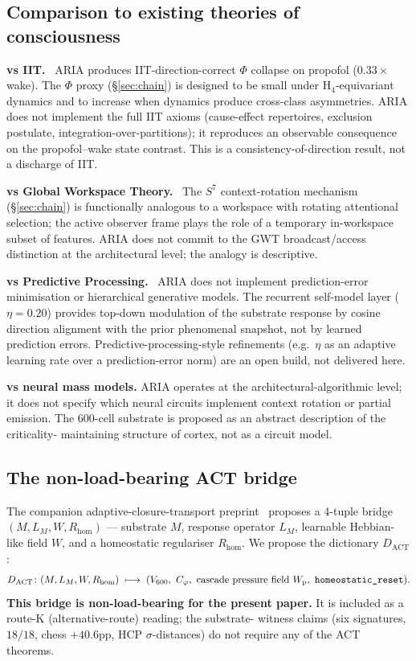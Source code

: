 \subsection{Comparison to existing theories of consciousness}

\textbf{vs IIT.}~\citep{Tononi2008,BalduzziTononi2008} ARIA produces
IIT-direction-correct $\Phi$ collapse on propofol ($0.33\!\times$
wake). The $\Phi$ proxy (\S\ref{sec:chain}) is designed to be small
under H$_4$-equivariant dynamics and to increase when dynamics
produce cross-class asymmetries. ARIA does not implement the full
IIT axioms (cause-effect repertoires, exclusion postulate,
integration-over-partitions); it reproduces an observable consequence
on the propofol--wake state contrast. This is a consistency-of-direction
result, not a discharge of IIT.

\textbf{vs Global Workspace Theory.}~\citep{Baars1988GWT,Dehaene2014ConsciousAndBrain}
The $S^{7}$ context-rotation mechanism (\S\ref{sec:chain}) is
functionally analogous to a workspace with rotating attentional
selection; the active observer frame plays the role of a temporary
in-workspace subset of features. ARIA does not commit to the GWT
broadcast/access distinction at the architectural level; the
analogy is descriptive.

\textbf{vs Predictive Processing.}~\citep{FristonFreeEnergy2010,ClarkPP2013}
ARIA does not implement prediction-error minimisation or hierarchical
generative models.
The recurrent self-model layer ($\eta\!=\!0.20$) provides top-down
modulation of the substrate response by cosine direction alignment
with the prior phenomenal snapshot, not by learned prediction errors.
Predictive-processing-style refinements (e.g.\ $\eta$ as an adaptive
learning rate over a prediction-error norm) are an open build, not
delivered here.

\textbf{vs neural mass models.} ARIA operates at the
architectural-algorithmic level; it does not specify which neural
circuits implement context rotation or partial emission. The 600-cell
substrate is proposed as an abstract description of the criticality-
maintaining structure of cortex, not as a circuit model.

\subsection{The non-load-bearing ACT bridge}\label{ssec:act_bridge}

The companion adaptive-closure-transport
preprint~\citep{SmartAdaptiveClosureTransport2026} proposes a
4-tuple bridge
$(M, L_{M}, W, R_{\mathrm{hom}})$ — substrate $M$, response operator
$L_{M}$, learnable Hebbian-like field $W$, and a homeostatic
regulariser $R_{\mathrm{hom}}$. We propose the dictionary
$D_{\mathrm{ACT}}$:
\[
D_{\mathrm{ACT}}\colon (M, L_{M}, W, R_{\mathrm{hom}})
\;\longmapsto\;
(V_{600},\ C_{\varphi},\ \text{cascade pressure field}\ W_{\mathrm{p}},
   \ \texttt{homeostatic\_reset}).
\]
\textbf{This bridge is non-load-bearing for the present paper.} It is
included as a route-K (alternative-route) reading; the substrate-
witness claims (six signatures, $18/18$, chess $+40.6$pp,
HCP $\sigma$-distances) do not require any of the ACT theorems.

